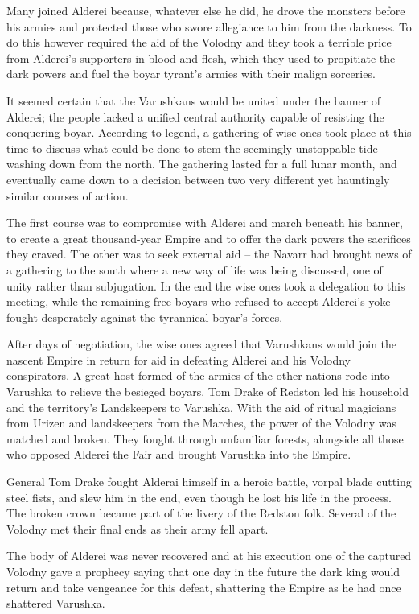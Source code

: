 \documentclass[twoside,11pt,b5paper,twocolumn]{scrbook}
\begin{document}
Many joined Alderei because, whatever else he did, he drove the monsters before his armies and protected those who swore allegiance to him from the darkness. To do this however required the aid of the Volodny and they took a terrible price from Alderei’s supporters in blood and flesh, which they used to propitiate the dark powers and fuel the boyar tyrant's armies with their malign sorceries.

It seemed certain that the Varushkans would be united under the banner of Alderei; the people lacked a unified central authority capable of resisting the conquering boyar. According to legend, a gathering of wise ones took place at this time to discuss what could be done to stem the seemingly unstoppable tide washing down from the north. The gathering lasted for a full lunar month, and eventually came down to a decision between two very different yet hauntingly similar courses of action.

The first course was to compromise with Alderei and march beneath his banner, to create a great thousand-year Empire and to offer the dark powers the sacrifices they craved. The other was to seek external aid – the Navarr had brought news of a gathering to the south where a new way of life was being discussed, one of unity rather than subjugation. In the end the wise ones took a delegation to this meeting, while the remaining free boyars who refused to accept Alderei’s yoke fought desperately against the tyrannical boyar's forces.

After days of negotiation, the wise ones agreed that Varushkans would join the nascent Empire in return for aid in defeating Alderei and his Volodny conspirators. A great host formed of the armies of the other nations rode into Varushka to relieve the besieged boyars. Tom Drake of Redston led his household and the territory's Landskeepers to Varushka. With the aid of ritual magicians from Urizen and landskeepers from the Marches, the power of the Volodny was matched and broken. They fought through unfamiliar forests, alongside all those who opposed Alderei the Fair and brought Varushka into the Empire.

General Tom Drake fought Alderai himself in a heroic battle, vorpal blade cutting steel fists, and slew him in the end, even though he lost his life in the process. The broken crown became part of the livery of the Redston folk. Several of the Volodny met their final ends as their army fell apart.

The body of Alderei was never recovered and at his execution one of the captured Volodny gave a prophecy saying that one day in the future the dark king would return and take vengeance for this defeat, shattering the Empire as he had once shattered Varushka.
\end{document}
